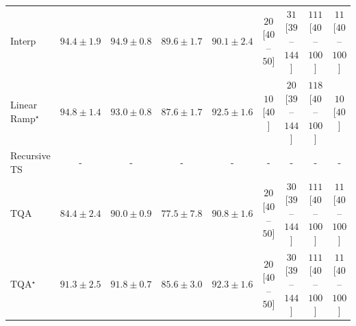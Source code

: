 \begin{tabular}{l|cccc|cccc|}
Interp & {\cellcolor[HTML]{187B3F}} \color[HTML]{F1F1F1} $94.4\pm 1.9$ & {\cellcolor[HTML]{12763D}} \color[HTML]{F1F1F1} $94.9\pm 0.8$ & {\cellcolor[HTML]{5CB86B}} \color[HTML]{F1F1F1} $89.6\pm 1.7$ & {\cellcolor[HTML]{51B365}} \color[HTML]{F1F1F1} $90.1\pm 2.4$ & {\cellcolor[HTML]{FFF4F0}} \color[HTML]{000000} $20$ [$40$--$50$] & {\cellcolor[HTML]{FEF1ED}} \color[HTML]{000000} $31$ [$39$--$144$] & {\cellcolor[HTML]{FDDAD7}} \color[HTML]{000000} $111$ [$40$--$100$] & {\cellcolor[HTML]{FFF7F3}} \color[HTML]{000000} $11$ [$40$--$100$] \\
Linear Ramp$^\star$ & {\cellcolor[HTML]{13773D}} \color[HTML]{F1F1F1} $94.8\pm 1.4$ & {\cellcolor[HTML]{2A8D49}} \color[HTML]{F1F1F1} $93.0\pm 0.8$ & {\cellcolor[HTML]{84CB7E}} \color[HTML]{000000} $87.6\pm 1.7$ & {\cellcolor[HTML]{2F944E}} \color[HTML]{F1F1F1} $92.5\pm 1.6$ & {\cellcolor[HTML]{FFF7F3}} \color[HTML]{000000} $10$ [$40$] & {\cellcolor[HTML]{FFF4F0}} \color[HTML]{000000} $20$ [$39$--$144$] & {\cellcolor[HTML]{FDD7D4}} \color[HTML]{000000} $118$ [$40$--$100$] & {\cellcolor[HTML]{FFF7F3}} \color[HTML]{000000} $10$ [$40$] \\
Recursive TS & {\cellcolor[HTML]{000000}} \color[HTML]{F1F1F1} {\cellcolor{white}} \color{black} - & {\cellcolor[HTML]{000000}} \color[HTML]{F1F1F1} {\cellcolor{white}} \color{black} - & {\cellcolor[HTML]{000000}} \color[HTML]{F1F1F1} {\cellcolor{white}} \color{black} - & {\cellcolor[HTML]{000000}} \color[HTML]{F1F1F1} {\cellcolor{white}} \color{black} - & {\cellcolor[HTML]{000000}} \color[HTML]{F1F1F1} {\cellcolor{white}} \color{black} - & {\cellcolor[HTML]{000000}} \color[HTML]{F1F1F1} {\cellcolor{white}} \color{black} - & {\cellcolor[HTML]{000000}} \color[HTML]{F1F1F1} {\cellcolor{white}} \color{black} - & {\cellcolor[HTML]{000000}} \color[HTML]{F1F1F1} {\cellcolor{white}} \color{black} - \\
TQA & {\cellcolor[HTML]{C0E597}} \color[HTML]{000000} $84.4\pm 2.4$ & {\cellcolor[HTML]{53B466}} \color[HTML]{F1F1F1} $90.0\pm 0.9$ & {\cellcolor[HTML]{FFFFE4}} \color[HTML]{000000} $77.5\pm 7.8$ & {\cellcolor[HTML]{43AC5E}} \color[HTML]{F1F1F1} $90.8\pm 1.6$ & {\cellcolor[HTML]{FFF4F0}} \color[HTML]{000000} $20$ [$40$--$50$] & {\cellcolor[HTML]{FEF1ED}} \color[HTML]{000000} $30$ [$39$--$144$] & {\cellcolor[HTML]{FDDAD7}} \color[HTML]{000000} $111$ [$40$--$100$] & {\cellcolor[HTML]{FFF7F3}} \color[HTML]{000000} $11$ [$40$--$100$] \\
TQA$^\star$ & {\cellcolor[HTML]{3DA559}} \color[HTML]{F1F1F1} $91.3\pm 2.5$ & {\cellcolor[HTML]{379E54}} \color[HTML]{F1F1F1} $91.8\pm 0.7$ & {\cellcolor[HTML]{ABDC8D}} \color[HTML]{000000} $85.6\pm 3.0$ & {\cellcolor[HTML]{31974F}} \color[HTML]{F1F1F1} $92.3\pm 1.6$ & {\cellcolor[HTML]{FFF4F0}} \color[HTML]{000000} $20$ [$40$--$50$] & {\cellcolor[HTML]{FEF1ED}} \color[HTML]{000000} $30$ [$39$--$144$] & {\cellcolor[HTML]{FDDAD7}} \color[HTML]{000000} $111$ [$40$--$100$] & {\cellcolor[HTML]{FFF7F3}} \color[HTML]{000000} $11$ [$40$--$100$] \\

\end{tabular}
